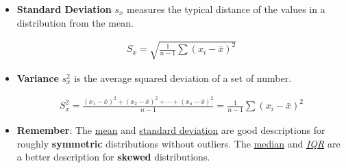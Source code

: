 \documentclass[Main.tex]{subfiles}
\begin{document}
\begin{exercise}
\begin{itemize}
			\item \textbf{Standard Deviation}  $s_{x}$ measures the typical distance of the values in  a distribution from the mean.
			\begin{definition}			
				\begin{subequations}
					\begin{align}
					S_{x}=\sqrt{\frac{1}{n-1}\sum(x_{i}-\bar{x})^{2}}
					\end{align}
				\end{subequations}
			\end{definition}\hfill
				
			\item \textbf{Variance} $s^{2}_{x}$  is the average squared deviation of a set of number.
			\begin{definition}[Variance]			
				\begin{subequations}
					\begin{align}
					S^{2}_{x}=\frac{(x_{1}-\bar{x})^{2}+(x_{2}-\bar{x})^{2}+\cdots+(x_{n}-\bar{x})^{2}}{n-1}=\frac{1}{n-1}\sum(x_{i}-\bar{x})^{2}
					\end{align}
				\end{subequations}
			\end{definition}\hfill
				
			\item \textbf{Remember}: The \underline{mean} and \underline{standard deviation} are good descriptions for roughly \textbf{symmetric} distributions without outliers. The \underline{median} and \underline{\emph{IQR}} are a better description for \textbf{skewed} distributions.
					
		\end{itemize}
	\end{exercise}	
\end{document}
